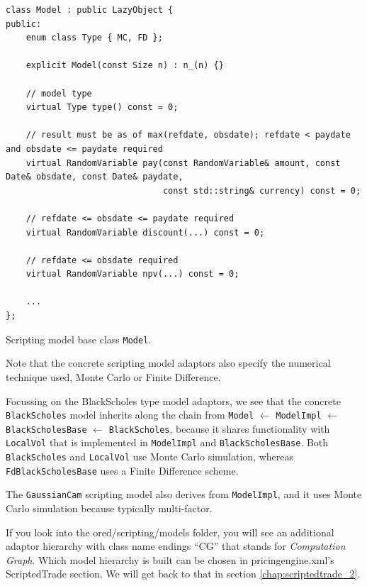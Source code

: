 \documentclass[12pt, a4paper]{report}
\begin{document}
\begin{listing}
\begin{verbatim}
class Model : public LazyObject {
public:
    enum class Type { MC, FD };

    explicit Model(const Size n) : n_(n) {}

    // model type
    virtual Type type() const = 0;

    // result must be as of max(refdate, obsdate); refdate < paydate and obsdate <= paydate required
    virtual RandomVariable pay(const RandomVariable& amount, const Date& obsdate, const Date& paydate,
                               const std::string& currency) const = 0;

    // refdate <= obsdate <= paydate required
    virtual RandomVariable discount(...) const = 0;

    // refdate <= obsdate required
    virtual RandomVariable npv(...) const = 0;

    ...
};
\end{verbatim}
\caption{Scripting model base class {\tt Model}.}
\label{lst:model}
\end{listing}

Note that the concrete scripting model adaptors also specify the numerical technique used,
Monte Carlo or Finite Difference. 

Focussing on the BlackScholes type model adaptors, we see that the concrete {\tt BlackScholes} model
inherits along the chain from {\tt Model} $\leftarrow$ {\tt ModelImpl} $\leftarrow$
{\tt BlackScholesBase} $\leftarrow$ {\tt BlackScholes}, because it shares functionality with
{\tt LocalVol} that is implemented in {\tt ModelImpl} and {\tt BlackScholesBase}.
Both {\tt BlackScholes} and {\tt LocalVol} use Monte Carlo simulation, whereas
{\tt FdBlackScholesBase} uses a Finite Difference scheme.

The {\tt GaussianCam} scripting model also derives from {\tt ModelImpl}, and it uses Monte Carlo
simulation because typically multi-factor.

If you look into the ored/scripting/models folder, you will see an additional adaptor hierarchy
with class name endings ``CG'' that stands for {\em Computation Graph}.
Which model hierarchy is built can be chosen in pricingengine.xml's
ScriptedTrade section. We will get back to that in section \ref{chap:scriptedtrade_2}.
\end{document}
